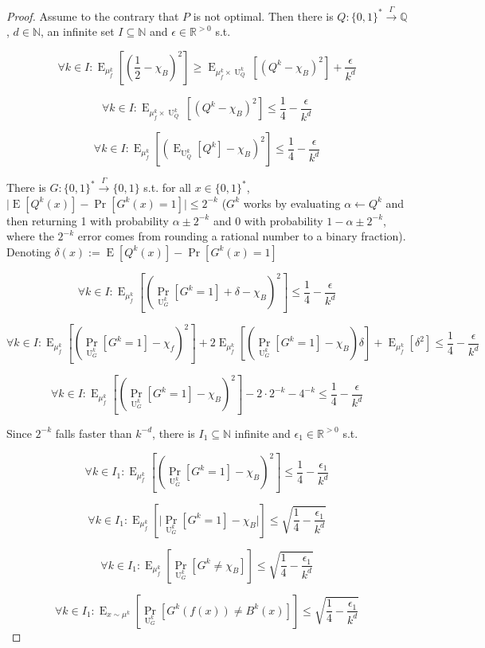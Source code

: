 \documentclass{article}
\numberwithin{equation}{section}
\theoremstyle{definition}
\theoremstyle{plain}
\newcommand{\Bool}{\{0,1\}}
\newcommand{\Words}{{\Bool^*}}
\DeclareMathOperator{\Prb}{Pr}
\DeclareMathOperator{\E}{E}
\DeclareMathOperator{\Un}{U}
\newcommand{\Nats}{\mathbb{N}}
\newcommand{\Rats}{\mathbb{Q}}
\newcommand{\Reals}{\mathbb{R}}
\newcommand{\Abs}[1]{\lvert #1 \rvert}
\newcommand{\Scheme}{\xrightarrow{\Gamma}}
\begin{document}
\begin{proof}

Assume to the contrary that $P$ is not optimal. Then there is ${Q: \Words \Scheme \Rats}$, $d \in \Nats$, an infinite set ${I \subseteq \Nats}$ and $\epsilon \in \Reals^{>0}$ s.t.

$$ \forall k \in I: \E_{\mu_f^k}[(\frac{1}{2}-\chi_B)^2] \geq \E_{\mu_f^k \times \Un_Q^k}[(Q^k-\chi_B)^2] +\frac{\epsilon}{k^d}$$

$$ \forall k \in I: \E_{\mu_f^k \times \Un_Q^{k}}[(Q^{k}-\chi_B)^2] \leq \frac{1}{4} - \frac{\epsilon}{k^d} $$

$$ \forall k \in I: \E_{\mu_f^k}[(\E_{\Un_Q^{k}}[Q^{k}]-\chi_B)^2] \leq \frac{1}{4} - \frac{\epsilon}{k^d} $$

There is $G: \Words \xrightarrow{\Gamma} \Bool$ s.t. for all ${x \in \Words}$, ${\Abs{\E[Q^{k}(x)]-\Pr[G^k(x)=1]}\leq 2^{-k}}$ ($G^k$ works by evaluating ${\alpha \leftarrow Q^{k}}$ and then returning 1 with probability $\alpha \pm 2^{-k}$ and 0 with probability $1-\alpha \pm 2^{-k}$, where the $2^{-k}$ error comes from rounding a rational number to a binary fraction). Denoting $\delta(x):=\E[Q^{k}(x)]-\Pr[G^k(x)=1]$

$$ \forall k \in I: \E_{\mu_f^k}[(\Prb_{\Un_G^k}[G^k=1]+\delta-\chi_B)^2] \leq \frac{1}{4} - \frac{\epsilon}{k^d} $$

$$ \forall k \in I: \E_{\mu_f^k}[(\Prb_{\Un_G^k}[G^k=1]-\chi_f)^2]+2 \E_{\mu_f^k}[(\Prb_{\Un_G^k}[G^k=1]-\chi_B)\delta]+\E_{\mu_f^k}[\delta^2] \leq \frac{1}{4} - \frac{\epsilon}{k^d}$$

$$ \forall k \in I: \E_{\mu_f^k}[(\Prb_{\Un_G^k}[G^k=1]-\chi_B)^2]-2 \cdot 2^{-k}- 4^{-k} \leq \frac{1}{4} - \frac{\epsilon}{k^d}$$

Since $2^{-k}$ falls faster than $k^{-d}$, there is $I_1 \subseteq \Nats$ infinite and $\epsilon_1 \in \Reals^{>0}$ s.t.

$$ \forall k \in I_1: \E_{\mu_f^k}[(\Prb_{\Un_G^k}[G^k=1]-\chi_B)^2] \leq \frac{1}{4} - \frac{\epsilon_1}{k^d}$$

$$ \forall k \in I_1: \E_{\mu_f^k}[\Abs{\Prb_{\Un_G^k}[G^k=1]-\chi_B}] \leq \sqrt{\frac{1}{4} - \frac{\epsilon_1}{k^d}} $$

$$ \forall k \in I_1: \E_{\mu_f^k}[\Prb_{\Un_G^k}[G^k \ne \chi_B]] \leq \sqrt{\frac{1}{4} - \frac{\epsilon_1}{k^d}} $$

$$ \forall k \in I_1: \E_{x \sim \mu^k}[\Prb_{\Un_G^k}[G^k(f(x)) \ne B^k(x)]] \leq \sqrt{\frac{1}{4} - \frac{\epsilon_1}{k^d}} $$


\end{proof}
\end{document}
